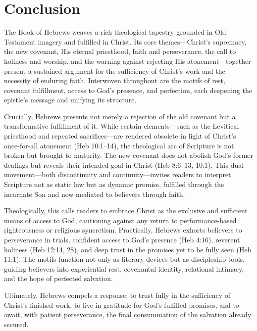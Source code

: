 \documentclass[12pt]{article}
\begin{document}
\section{Conclusion}
The Book of Hebrews weaves a rich theological tapestry grounded in Old Testament
imagery and fulfilled in Christ. Its core themes---Christ’s supremacy, the new
covenant, His eternal priesthood, faith and perseverance, the call to holiness
and worship, and the warning against rejecting His atonement---together present
a sustained argument for the sufficiency of Christ’s work and the necessity of
enduring faith. Interwoven throughout are the motifs of rest, covenant
fulfillment, access to God’s presence, and perfection, each deepening the
epistle’s message and unifying its structure.

Crucially, Hebrews presents not merely a rejection of the old covenant but a
transformative fulfillment of it. While certain elements---such as the Levitical
priesthood and repeated sacrifices---are rendered obsolete in light of Christ’s
once-for-all atonement (Heb 10:1–14), the theological arc of Scripture is not
broken but brought to maturity. The new covenant does not abolish God’s former
dealings but reveals their intended goal in Christ (Heb 8:6–13, 10:1). This dual
movement—both discontinuity and continuity—invites readers to interpret
Scripture not as static law but as dynamic promise, fulfilled through the
incarnate Son and now mediated to believers through faith.

Theologically, this calls readers to embrace Christ as the exclusive and
sufficient means of access to God, cautioning against any return to
performance-based righteousness or religious syncretism. Practically, Hebrews
exhorts believers to perseverance in trials, confident access to God’s presence
(Heb 4:16), reverent holiness (Heb 12:14, 28), and deep trust in the promises
yet to be fully seen (Heb 11:1). The motifs function not only as literary
devices but as discipleship tools, guiding believers into experiential rest,
covenantal identity, relational intimacy, and the hope of perfected salvation.

Ultimately, Hebrews compels a response: to trust fully in the sufficiency of
Christ’s finished work, to live in gratitude for God’s fulfilled promises, and
to await, with patient perseverance, the final consummation of the salvation
already secured.
\end{document}
